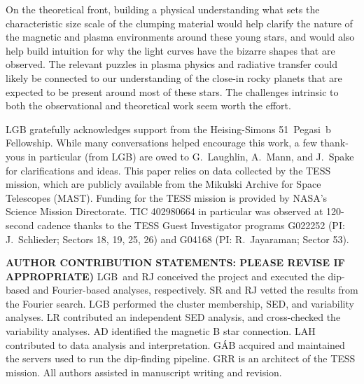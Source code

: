 \documentclass[11pt,twocolumn,tighten]{aastex63}
\begin{document}
On the theoretical front, building a physical understanding what sets
the characteristic size scale of the clumping material would help
clarify the nature of the magnetic and plasma environments around
these young stars, and would also help build intuition for why the
light curves have the bizarre shapes that are observed.  The relevant
puzzles in plasma physics and radiative transfer could likely be
connected to our understanding of the close-in rocky planets that are
expected to be present around most of these stars.  The challenges
intrinsic to both the observational and theoretical work seem worth
the effort.



\acknowledgments
LGB gratefully acknowledges support from the Heising-Simons
51~Pegasi~b Fellowship.  While many conversations helped encourage
this work, a few thank-yous in particular (from LGB) are owed to
G.~Laughlin, A.~Mann, and J.~Spake for clarifications and ideas.  This
paper relies on data collected by the TESS mission, which are publicly
available from the Mikulski Archive for Space Telescopes (MAST).
Funding for the TESS mission is provided by NASA’s Science Mission
Directorate.  TIC 402980664 in particular was observed at 120-second
cadence thanks to the TESS Guest Investigator programs G022252 (PI:
J.~Schlieder; Sectors 18, 19, 25, 26) and G04168 (PI: R.~Jayaraman;
Sector 53).


{\bf AUTHOR CONTRIBUTION STATEMENTS: PLEASE REVISE IF APPROPRIATE)}
LGB~and RJ conceived the project and executed the dip-based and
Fourier-based analyses, respectively.
SR and RJ vetted the results from the Fourier search.
LGB performed the cluster membership, SED, and variability analyses.
LR contributed an independent SED analysis, and cross-checked the
variability analyses.
AD identified the magnetic B star connection.
LAH contributed to data analysis and interpretation.
G\'AB acquired and maintained the servers used to run the dip-finding
pipeline.
GRR is an architect of the TESS mission.
All authors assisted in manuscript writing and revision.

\end{document}

